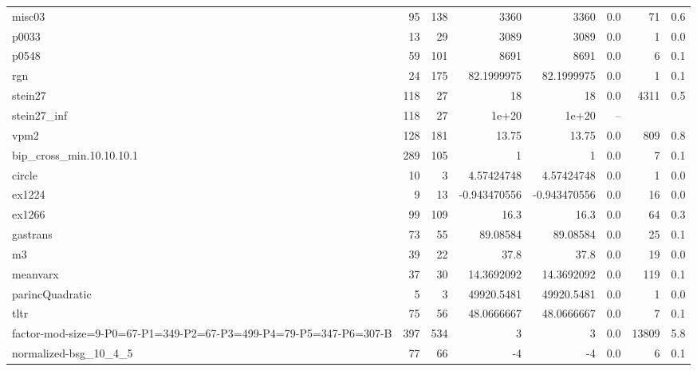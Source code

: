 \documentclass[leqno]{article}
\begin{document}
\begin{center}
\begin{supertabular*}{\textwidth}{@{\extracolsep{\fill}}lrrrrrrr@{}}
misc03             &     95 &    138 &             3360 &             3360 &    0.0 &        71 &      0.6\\
p0033              &     13 &     29 &             3089 &             3089 &    0.0 &         1 &      0.0\\
p0548              &     59 &    101 &             8691 &             8691 &    0.0 &         6 &      0.1\\
rgn                &     24 &    175 &       82.1999975 &       82.1999975 &    0.0 &         1 &      0.1\\
stein27            &    118 &     27 &               18 &               18 &    0.0 &      4311 &      0.5\\
stein27\_inf       &    118 &     27 &            1e+20 &            1e+20 &   --   & &\\
vpm2               &    128 &    181 &            13.75 &            13.75 &    0.0 &       809 &      0.8\\
bip\_cross\_min.10.10.10.1 &    289 &    105 &                1 &                1 &    0.0 &         7 &      0.1\\
circle             &     10 &      3 &       4.57424748 &       4.57424748 &    0.0 &         1 &      0.0\\
ex1224             &      9 &     13 &     -0.943470556 &     -0.943470556 &    0.0 &        16 &      0.0\\
ex1266             &     99 &    109 &             16.3 &             16.3 &    0.0 &        64 &      0.3\\
gastrans           &     73 &     55 &         89.08584 &         89.08584 &    0.0 &        25 &      0.1\\
m3                 &     39 &     22 &             37.8 &             37.8 &    0.0 &        19 &      0.0\\
meanvarx           &     37 &     30 &       14.3692092 &       14.3692092 &    0.0 &       119 &      0.1\\
parincQuadratic    &      5 &      3 &       49920.5481 &       49920.5481 &    0.0 &         1 &      0.0\\
tltr               &     75 &     56 &       48.0666667 &       48.0666667 &    0.0 &         7 &      0.1\\
factor-mod-size=9-P0=67-P1=349-P2=67-P3=499-P4=79-P5=347-P6=307-B &    397 &    534 &                3 &                3 &    0.0 &     13809 &      5.8\\
normalized-bsg\_10\_4\_5 &     77 &     66 &               -4 &               -4 &    0.0 &         6 &      0.1\\

\end{supertabular*}
\end{center}
\end{document}
